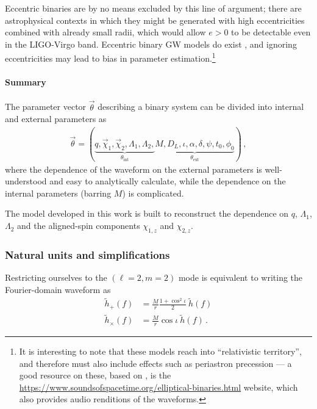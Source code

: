 \documentclass[main.tex]{subfiles}
\begin{document}
Eccentric binaries are by no means excluded by this line of argument; there are astrophysical contexts in which they might be generated with high eccentricities combined with already small radii, which would allow \(e > 0\) to be detectable even in the \ac{LIGO}-Virgo band.
Eccentric binary \ac{GW} models do exist \cite{favataConstrainingOrbitalEccentricity2021}, and ignoring eccentricities may lead to bias in parameter estimation.\footnote{It is interesting to note that these models reach into ``relativistic territory'', and therefore must also include effects such as periastron precession --- a good resource on these, based on \textcite{favataGravitationalwaveMemoryEccentric2011}, is the \href{Sounds of Spacetime}{https://www.soundsofspacetime.org/elliptical-binaries.html} website, which also provides audio renditions of the waveforms.}

\paragraph{Summary}

The parameter vector \(\vec{\theta}\) describing a binary system can be divided into internal and external parameters as 
%
\begin{align}
\vec{\theta} = (\underbrace{q, \vec{\chi}_1, \vec{\chi}_2, \Lambda_1, \Lambda_2,}_{\theta _{\text{int}}} \underbrace{M, D_L, \iota, \alpha, \delta, \psi, t_0, \phi_0 }_{\theta _{\text{ext}}})
\,,
\end{align}
%
where the dependence of the waveform on the external parameters is well-understood and easy to analytically calculate, while the dependence on the internal parameters (barring \(M\)) is complicated.

The model developed in this work is built to reconstruct the dependence on \(q\), \(\Lambda_1\), \(\Lambda_2 \) and the aligned-spin components \(\chi_{1,z} \) and \(\chi_{2, z}\). 

\subsubsection{Natural units and simplifications} 

Restricting ourselves to the \((\ell=2, m=2)\) mode is equivalent to writing the Fourier-domain waveform as 
%
\begin{align}
\widetilde{h}_{+}(f) &= \frac{M}{r} \frac{1 + \cos^2 \iota }{2} \ \widetilde{h} (f)  \\
\widetilde{h}_{ \times } (f) &= \frac{M}{r} \cos \iota \ \widetilde{h}(f)
\,.
\end{align}
\end{document}
